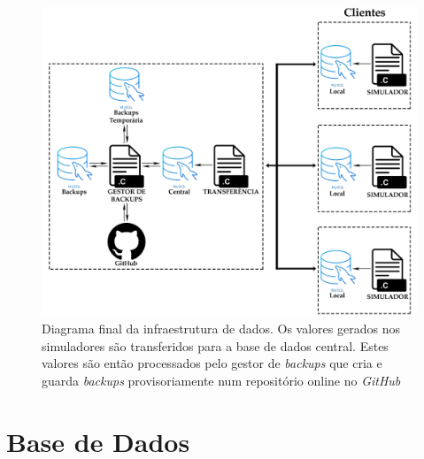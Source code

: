 \documentclass[11pt,twoside,a4paper]{report}
\begin{document}
\begin{figure}
	\begin{center}
		\includegraphics[width=1\textwidth]{Esquema_Projeto_6} %
		\caption[Diagrama final da infraestrutura]{Diagrama final da infraestrutura de dados. Os valores gerados nos simuladores são transferidos para a base de dados central. Estes valores são então processados pelo gestor de \textit{backups} que cria e guarda \textit{backups} provisoriamente num repositório online no \textit{GitHub}}
		\label{fig:infra3}
		\end{center}
\end{figure}

\section{Base de Dados}
\end{document}
